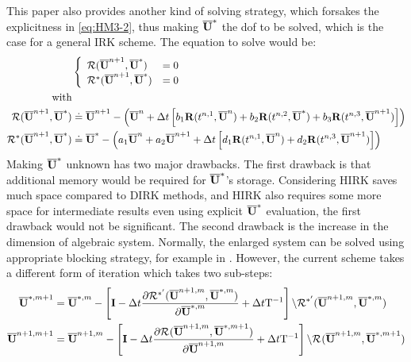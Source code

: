 \documentclass[preprint,12pt]{elsarticle}
\begin{document}
This paper also provides another kind of
solving strategy,
which forsakes the explicitness in \eqref{eq:HM3-2},
thus making $\overline{\mathbf{U}}^*$ the dof to be solved,
which is the case for a general IRK scheme.
The equation to solve would be:
\begin{equation}
    \begin{aligned}
                                  & \left\{
        \begin{array}[2]{ll}
            \Res(\uu^{n+1},\uu^{*})   & = 0 \\
            \Res^*(\uu^{n+1},\uu^{*}) & = 0 \\
        \end{array}
        \right.                                               \\
        \text{with}               &                           \\
        \Res(\uu^{n+1},\uu^{*})   & \doteq \uu^{n+1} - \left(
        \uu^{n} +
        \inc t
        \left[
            b_1\R(t^{n,1}, \uu^n) +
            b_2\R(t^{n,2}, \uu^*) +
            b_3\R(t^{n,3}, \uu^{n+1})
            \right]
        \right)                                               \\
        \Res^*(\uu^{n+1},\uu^{*}) & \doteq\uu^{*} - \left(
        a_1\uu^{n} +
        a_2\uu^{n+1} +
        \inc t
        \left[
            d_1\R(t^{n,1}, \uu^n) +
            d_2\R(t^{n,3}, \uu^{n+1})
            \right]
        \right)
    \end{aligned}
\end{equation}
Making $\overline{\mathbf{U}}^*$ unknown has two major drawbacks.
The first drawback is that additional memory
would be required for $\overline{\mathbf{U}}^*$'s storage.
Considering HIRK saves much space compared to
DIRK methods, and HIRK also requires some more space
for intermediate results even using explicit $\overline{\mathbf{U}}^*$ evaluation,
the first drawback would not be significant.
The second drawback is the increase in the dimension of
algebraic system.
Normally, the enlarged system can be solved
using appropriate blocking strategy,
for example in \cite{pazner2017stage}.
However, the current scheme takes a different form of
iteration which takes two sub-steps:
\begin{equation}
    \label{eq:intersolve}
    \begin{aligned}
        \overline{\mathbf{U}}^{*,m+1}   & = \overline{\mathbf{U}}^{*,m} - \left[
            \mathbf{I} - \mathrm\Delta t \frac{\partial \mathcal{R}^{*'}(\overline{\mathbf{U}}^{n+1,m},\overline{\mathbf{U}}^{*,m})}
            {\partial \overline{\mathbf{U}}^{*,m}}
            + \mathrm\Delta t \mathrm{T}^{-1}
            \right]
        \backslash \mathcal{R}^{*'}(\overline{\mathbf{U}}^{n+1,m},\overline{\mathbf{U}}^{*,m}) \\
        \overline{\mathbf{U}}^{n+1,m+1} & = \overline{\mathbf{U}}^{n+1,m} - \left[
            \mathbf{I} - \mathrm\Delta t \frac{\partial \mathcal{R}^{}(\overline{\mathbf{U}}^{n+1,m},\overline{\mathbf{U}}^{*,m+1})}
            {\partial \overline{\mathbf{U}}^{n+1,m}}
            + \mathrm\Delta t \mathrm{T}^{-1}
            \right]
        \backslash \mathcal{R}^{}(\overline{\mathbf{U}}^{n+1,m},\overline{\mathbf{U}}^{*,m+1}) \\
    \end{aligned}
\end{equation}
\end{document}
